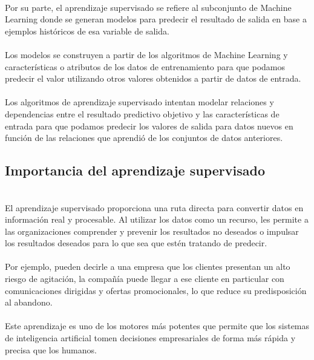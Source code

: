 \documentclass[11pt,a4paper]{article}
\begin{document}
    		\\Por su parte, el aprendizaje supervisado se refiere al subconjunto de Machine Learning donde se generan modelos para predecir el resultado de salida en base a ejemplos históricos de esa variable de salida.\\ 
    		
    		\\Los modelos se construyen a partir de los algoritmos de Machine Learning y características o atributos de los datos de entrenamiento para que podamos predecir el valor utilizando otros valores obtenidos a partir de datos de entrada.\\

            \\Los algoritmos de aprendizaje supervisado intentan modelar relaciones y dependencias entre el resultado predictivo objetivo y las características de entrada para que podamos predecir los valores de salida para datos nuevos en función de las relaciones que aprendió de los conjuntos de datos anteriores.\\
            
            \subsection{Importancia del aprendizaje supervisado}
            
            \\El aprendizaje supervisado proporciona una ruta directa para convertir datos en información real y procesable. Al utilizar los datos como un recurso, les permite a las organizaciones comprender y prevenir los resultados no deseados o impulsar los resultados deseados para lo que sea que estén tratando de predecir.\\

            \\Por ejemplo, pueden decirle a una empresa que los clientes presentan un alto riesgo de agitación, la compañía puede llegar a ese cliente en particular con comunicaciones dirigidas y ofertas promocionales, lo que reduce su predisposición al abandono.\\

            \\Este aprendizaje es uno de los motores más potentes que permite que los sistemas de inteligencia artificial tomen decisiones empresariales de forma más rápida y precisa que los humanos.\\
\end{document}
